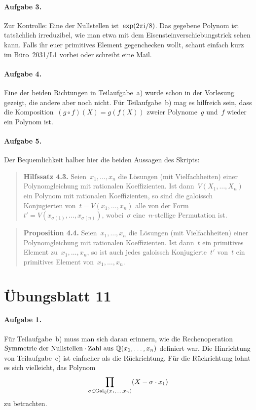 \documentclass{../algblatt}
\begin{document}
\paragraph{Aufgabe 3.} Zur Kontrolle: Eine der Nullstellen
ist~$\exp(2\pi\mathrm{i}/8)$. Das gegebene Polynom ist tatsächlich irreduzibel, wie man
etwa mit dem Eisensteinverschiebungstrick sehen kann. Falls ihr euer primitives
Element gegenchecken wollt, schaut einfach kurz im Büro~2031/L1 vorbei oder
schreibt eine Mail.

\paragraph{Aufgabe 4.} Eine der beiden Richtungen in Teilaufgabe~a) wurde schon
in der Vorlesung gezeigt, die andere aber noch nicht. Für Teilaufgabe~b) mag es
hilfreich sein, dass die Komposition~$(g \circ f)(X) = g(f(X))$ zweier
Polynome~$g$ und~$f$ wieder ein Polynom ist.

\paragraph{Aufgabe 5.} Der Bequemlichkeit halber hier die beiden Aussagen des
Skripts:
\begin{quote}
\textbf{Hilfssatz 4.3.}
Seien~$x_1,\ldots,x_n$ die Lösungen (mit Vielfachheiten) einer Polynomgleichung
mit rationalen Koeffizienten. Ist dann~$V(X_1,\ldots,X_n)$ ein Polynom mit
rationalen Koeffizienten, so sind die galoissch Konjugierten von~$t =
V(x_1,\ldots,x_n)$ alle von der Form~$t' =
V(x_{\sigma(1)},\ldots,x_{\sigma(n)})$, wobei~$\sigma$ eine~$n$-stellige
Permutation ist.
\end{quote}

\begin{quote}
\textbf{Proposition 4.4.}
Seien~$x_1,\ldots,x_n$ die Lösungen (mit Vielfachheiten) einer Polynomgleichung
mit rationalen Koeffizienten. Ist dann~$t$ ein primitives Element
zu~$x_1,\ldots,x_n$, so ist auch jedes galoissch Konjugierte~$t'$ von~$t$ ein
primitives Element von~$x_1,\ldots,x_n$.
\end{quote}


\section*{Übungsblatt 11}

\paragraph{Aufgabe 1.} Für Teilaufgabe~b) muss man sich daran erinnern, wie die
Rechenoperation $\text{Symmetrie der Nullstellen} \cdot \text{Zahl
aus~$\mathbb{Q}(x_1,\ldots,x_n)$}$ definiert war. Die Hinrichtung von Teilaufgabe~c)
ist einfacher als die Rückrichtung. Für die Rückrichtung lohnt es sich
vielleicht, das Polynom
\[ \prod_{\sigma \in \mathrm{Gal}_{\mathbb{Q}}(x_1,\ldots,x_n)} (X - \sigma \cdot x_1) \]
zu betrachten.
\end{document}

